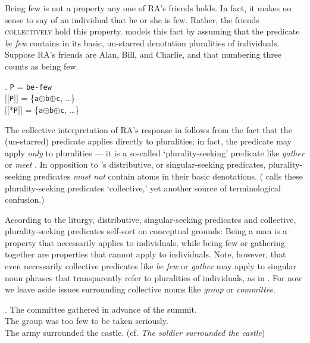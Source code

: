 \documentclass[linguex]{sp}
\newcommand{\sem}[1]{\mbox{$[\![$#1$]\!]$}}
\renewcommand{\tt}{\texttt}
\newcommand{\op}{$\oplus$}
\begin{document}
Being few is not a property any one of RA's friends holds. In fact, it makes no sense to say of an individual that he or she is few. Rather, the friends \textsc{collectively} hold this property. \citeauthor{link1983} models this fact by assuming that the predicate \emph{be few} contains in its basic, un-starred denotation pluralities of individuals. Suppose RA's friends are Alan, Bill, and Charlie, and that numbering three counts as being few.

\ex. \tt{P} = \tt{be-few}\\
\sem{\tt{P}} = \{\tt{a}\op\tt{b}\op\tt{c}, \ldots\}\\
\sem{*\tt{P}} = \{\tt{a}\op\tt{b}\op\tt{c}, \ldots\}

The collective interpretation of RA's response in \LLast follows from the fact that the (un-starred) predicate applies directly to pluralities; in fact, the predicate may apply \emph{only} to pluralities --- it is a so-called `plurality-seeking' predicate like \emph{gather} or \emph{meet} \citep{schwarzschild1994}. In opposition to \citeauthor{link1983}'s distributive, or singular-seeking predicates, plurality-seeking predicates \emph{must not} contain atoms in their basic denotations. (\citeauthor{link1983} calls these plurality-seeking predicates `collective,' yet another source of terminological confusion.)

According to the liturgy, distributive, singular-seeking predicates and collective, plurality-seeking predicates self-sort on conceptual grounds: Being a man is a property that necessarily applies to individuals, while being few or gathering together are properties that cannot apply to individuals. Note, however, that even necessarily collective predicates like \emph{be few} or \emph{gather} may apply to singular noun phrases that transparently refer to pluralities of individuals, as in \Next. For now we leave aside issues surrounding collective nouns like \emph{group} or \emph{committee}. %

\ex. The committee gathered in advance of the summit.\\
The group was too few to be taken seriously.\\
The army surrounded the castle. (cf. \emph{The soldier surrounded the castle})
\end{document}
